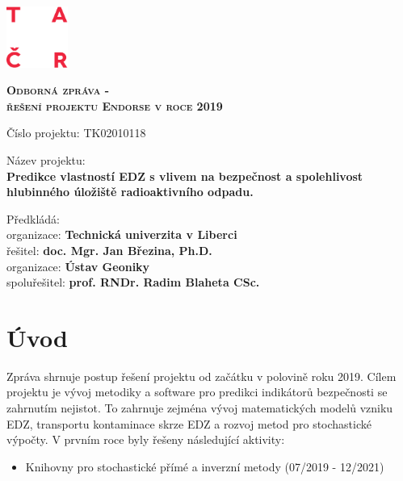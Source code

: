 \documentclass[11pt,a4paper]{article}
\begin{document}
\begin{onehalfspacing} 


\begin{titlepage}
    \includegraphics[width=2cm]{logo_TACR_zakl.pdf}

    \vspace{6cm}
    {\centering	
      {\scshape\bf\huge Odborná zpráva - \\
      řešení projektu Endorse v roce 2019\par}
    }
	
    \vspace{3cm}	
    {\LARGE
      {\noindent Číslo projektu:  TK02010118
        {\bfseries }\par}
      \vspace{2ex}
      {\noindent Název projektu: \\
        {\bfseries Predikce vlastností EDZ s vlivem na bezpečnost a spolehlivost
         hlubinného úložiště radioaktivního odpadu.} \par}
      \vspace{2ex}
      {\noindent Předkládá: \\
      \-\hspace{2ex} organizace: {\bfseries Technická univerzita v Liberci}\\
      \-\hspace{2ex} řešitel: {\bfseries doc. Mgr. Jan Březina, Ph.D.}\\
      \-\hspace{2ex} organizace: {\bfseries Ústav Geoniky}\\
      \-\hspace{2ex} spoluřešitel: {\bfseries prof. RNDr. Radim Blaheta CSc.}\par}

    }  
    \vfill
\end{titlepage}


\section{Úvod}
Zpráva shrnuje postup řešení projektu od začátku v polovině roku 2019. Cílem projektu je
vývoj metodiky a software pro predikci indikátorů bezpečnosti se zahrnutím nejistot.
To zahrnuje zejména vývoj matematických modelů vzniku EDZ, transportu kontaminace skrze EDZ a rozvoj metod pro stochastické výpočty. V prvním roce byly řešeny následující aktivity:
\begin{itemize}
\item Knihovny pro stochastické přímé a inverzní metody (07/2019 - 12/2021)


\end{itemize}
\end{onehalfspacing}
\end{document}

